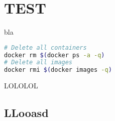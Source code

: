 \documentclass[8pt, twoside]{extarticle}
\begin{document}
\section{TEST}
  bla


  \begin{lstlisting}[language=sh]
# Delete all containers
docker rm $(docker ps -a -q)
# Delete all images
docker rmi $(docker images -q)
  \end{lstlisting}

  LOLOLOL
  \subsection{LLooasd}
  \lipsum[1-20]
\end{document}
